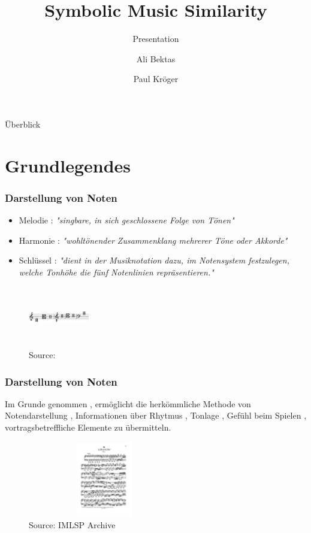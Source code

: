 \documentclass{beamer}
\title{Symbolic Music Similarity}
\subtitle{Presentation}
\author{Ali Bektas \and Paul Kröger}
\begin{document}
	

	\begin{frame}\maketitle\end{frame}
	\begin{frame}{Überblick} \tableofcontents \end{frame}

	\section{Grundlegendes}

	\begin{frame}
  		\frametitle{Darstellung von Noten}
  		\begin{minipage}{0.45\textwidth}
  			\begin{itemize}
			\item Melodie : \textit{"singbare, in sich geschlossene Folge von Tönen"} \cite{duden_melodie}
			\item Harmonie : \textit{"wohltönender Zusammenklang mehrerer Töne oder Akkorde"} \cite{duden_harmonie}
			\item Schlüssel : \textit{"dient in der Musiknotation dazu, im Notensystem festzulegen, welche Tonhöhe die fünf Notenlinien repräsentieren."} \cite{def_schlussel}
			\end{itemize}
		\end{minipage}%
		\begin{minipage}{0.45\textwidth}
			\begin{figure}[h!]
				\includegraphics[width=100px,height=100px,keepaspectratio]{Clefs_chord}
				\caption{Source: \cite{def_schlussel}}
			\end{figure}
		\end{minipage}
	\end{frame}

	\begin{frame}
		\frametitle{Darstellung von Noten}
		Im Grunde genommen , ermöglicht die herkömmliche Methode von Notendarstellung , Informationen über Rhytmus , Tonlage , Gefühl beim Spielen , vortragsbetreffliche Elemente zu übermitteln.
		\begin{figure}[h!]
			\includegraphics[width=250px,height=125px,keepaspectratio]{bach_adagio}
			\caption{Source: IMLSP Archive}
		\end{figure}
	\end{frame}
\end{document}
